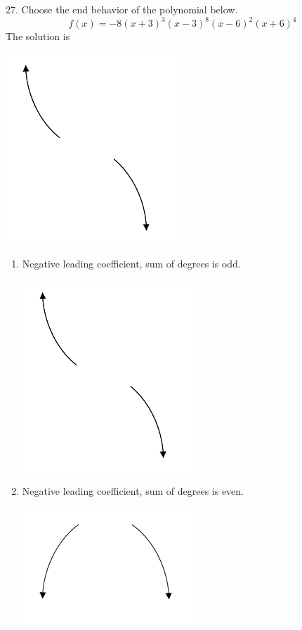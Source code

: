 \documentclass{article}[10pt]
\begin{document}
27. Choose the end behavior of the polynomial below.
$$ f(x) = -8(x + 3)^{3}(x - 3)^{8}(x - 6)^{2}(x + 6)^{4} $$ 
The solution is  
\begin{center}\includegraphics[scale=0.5]{../Figures/endBehaviorNegativeOdd.png}\end{center}\begin{enumerate}[label=\Alph*.] 
\item Negative leading coefficient, sum of degrees is odd. 
\begin{center}\includegraphics[scale=0.5]{../Figures/endBehaviorNegativeOdd.png}\end{center} 
 
\item Negative leading coefficient, sum of degrees is even. 
\begin{center}\includegraphics[scale=0.5]{../Figures/endBehaviorNegativeEven.png}\end{center} 
 

\end{enumerate}
\end{document}

